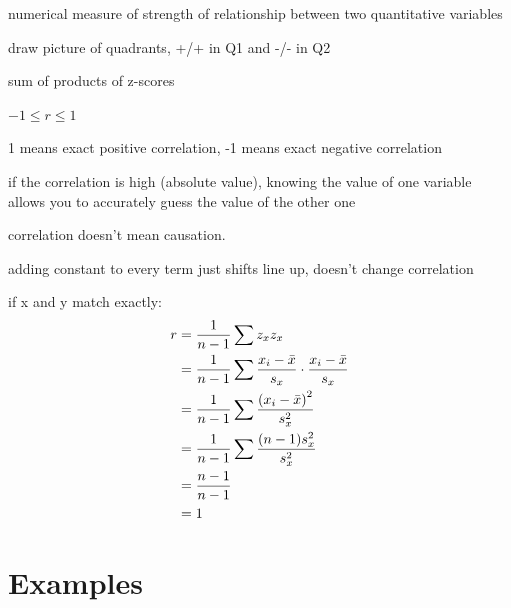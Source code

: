 \documentclass[landscape]{exam}
\begin{document}
  \begin{itemize*}
    \item numerical measure of strength of relationship between two quantitative
      variables

    \item draw picture of quadrants, +/+ in Q1 and -/- in Q2

    \item sum of products of z-scores

    \item $-1 \leq r \leq 1$

    \item 1 means exact positive correlation, -1 means exact negative
      correlation

    \item if the correlation is high (absolute value), knowing the value of
      one variable allows you to accurately guess the value of the
      other one

    \item correlation doesn't mean causation.  

    \item adding constant to every term just shifts line up, doesn't change
      correlation

  \end{itemize*}

  if x and y match exactly:
  \begin{align*}
    r & = \frac{1}{n - 1} \sum z_x z_x \\
      & = \frac{1}{n - 1} \sum \frac{x_i - \bar{x}}{s_x} \cdot \frac{x_i - \bar{x}}{s_x} \\
      & = \frac{1}{n - 1} \sum \frac{\del{ x_i - \bar{x} }^2}{s_x^2} \\
      & = \frac{1}{n - 1} \sum \frac{(n - 1) s_x^2}{s_x^2} \\
      & = \frac{n - 1}{n - 1} \\
      & = 1 \\
  \end{align*}

  \section{Examples}
\end{document}

